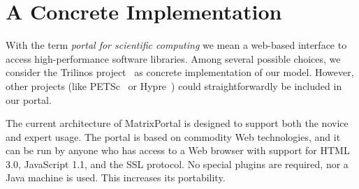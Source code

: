 \documentclass[11pt,relax]{SANDreport}
\begin{document}
\section{A Concrete Implementation}
\label{sec:concrete}

With the term {\sl portal for scientific computing} we mean a web-based
interface to access high-performance software libraries. Among several
possible choices, we consider the Trilinos project~\cite{trilinos}
as concrete implementation
of our model. However, other projects (like PETSc~\cite{petsc-guide} 
                                       or Hypre~\cite{hypre}) could
straightforwardly be included in our portal.

The current architecture of MatrixPortal is designed to support both the
novice and expert usage.
The portal is based on commodity Web technologies,
and it can be run by anyone who has access to a Web browser with support for
HTML 3.0, JavaScript 1.1, and the SSL protocol.  No special plugins are
required, nor a Java machine is used. This increases its portability.
\end{document}
